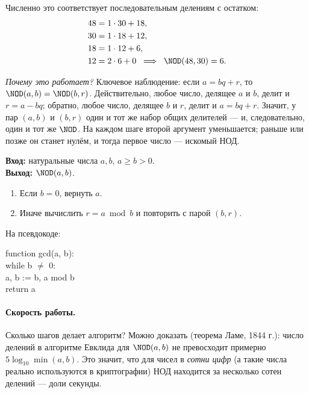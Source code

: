 Численно это соответствует последовательным делениям с остатком:
\begin{align*}
48 &= 1\cdot 30 + 18,\\
30 &= 1\cdot 18 + 12,\\
18 &= 1\cdot 12 + 6,\\
12 &= 2\cdot 6 + 0 \;\;\Longrightarrow\;\; \NOD(48,30) = 6.
\end{align*}

\noindent
\emph{Почему это работает?} Ключевое наблюдение: если $a = bq + r$, то $\NOD(a, b) = \NOD(b, r)$. Действительно, любое число, делящее $a$ и $b$, делит и $r = a - bq$; обратно, любое число, делящее $b$ и $r$, делит и $a = bq + r$. Значит, у пар $(a,b)$ и $(b,r)$ один и тот же набор общих делителей --- и, следовательно, один и тот же $\NOD$. На каждом шаге второй аргумент уменьшается; раньше или позже он станет нулём, и тогда первое число --- искомый НОД.

\begin{algorithmbox}[title={Алгоритм: нахождение НОД (Евклид)}]
\textbf{Вход:} натуральные числа $a, b$, $a \ge b > 0$.\\
\textbf{Выход:} $\NOD(a,b)$.
\begin{enumerate}
  \item Если $b = 0$, вернуть $a$.
  \item Иначе вычислить $r = a \bmod b$ и повторить с парой $(b, r)$.
\end{enumerate}
\end{algorithmbox}

На псевдокоде:
\begin{center}
\begin{minipage}{0.7\linewidth}
\ttfamily\small
\noindent
function gcd(a, b):\\
\quad while b $\ne$ 0:\\
\qquad a, b := b, a mod b\\
\quad return a
\end{minipage}
\end{center}

\paragraph*{Скорость работы.} Сколько шагов делает алгоритм? Можно доказать (теорема Ламе, 1844 г.): число делений в алгоритме Евклида для $\NOD(a,b)$ не превосходит примерно $5\log_{10}\min(a,b)$. Это значит, что для чисел в \emph{сотни цифр} (а такие числа реально используются в криптографии) НОД находится за несколько сотен делений --- доли секунды.

